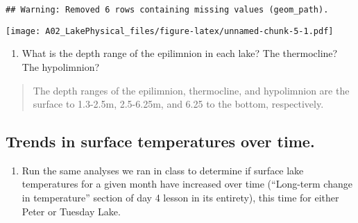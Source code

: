 \documentclass[]{article}
\providecommand{\tightlist}{%
  \setlength{\itemsep}{0pt}\setlength{\parskip}{0pt}}
\begin{document}
\begin{verbatim}
## Warning: Removed 6 rows containing missing values (geom_path).
\end{verbatim}

\texttt{[image: A02\_LakePhysical\_files/figure-latex/unnamed-chunk-5-1.pdf]}

\begin{enumerate}
\def\labelenumi{\arabic{enumi}.}
\setcounter{enumi}{9}
\tightlist
\item
  What is the depth range of the epilimnion in each lake? The
  thermocline? The hypolimnion?
\end{enumerate}

\begin{quote}
The depth ranges of the epilimnion, thermocline, and hypolimnion are the
surface to 1.3-2.5m, 2.5-6.25m, and 6.25 to the bottom, respectively.
\end{quote}

\hypertarget{trends-in-surface-temperatures-over-time.}{%
\subsection{Trends in surface temperatures over
time.}\label{trends-in-surface-temperatures-over-time.}}

\begin{enumerate}
\def\labelenumi{\arabic{enumi}.}
\setcounter{enumi}{10}
\tightlist
\item
  Run the same analyses we ran in class to determine if surface lake
  temperatures for a given month have increased over time (``Long-term
  change in temperature'' section of day 4 lesson in its entirety), this
  time for either Peter or Tuesday Lake.
\end{enumerate}
\end{document}
